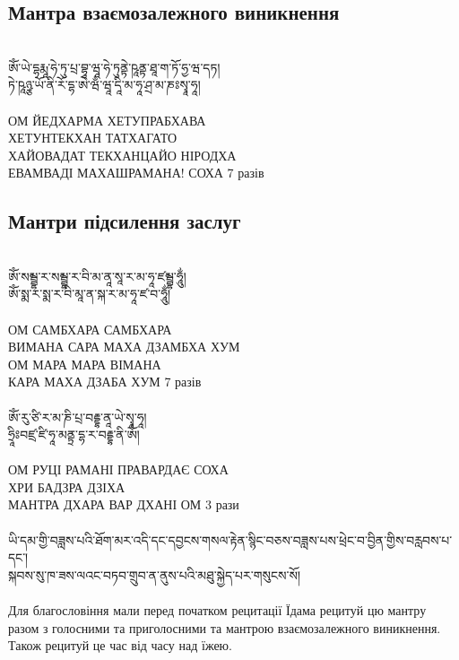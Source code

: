 \subsection*{Мантра взаємозалежного виникнення}
\\
\ti
ཨོཾ་ཡེ་དྷརྨཱ་ཧེ་ཏུ་པྲ་བྷཱ་ཝཱ་ཧེ་ཏུནྟེ་ཥཱནྟ་ཐཱ་ག་ཏོ་ཧྱ་ཝ་དཏ།\\
 ཏེ་ཥཱཉྩ་ཡོ་ནི་རོ་དྷ་ཨེ་ཝྃ་ཝཱ་དཱི་མ་ཧཱ་ཤྲ་མ་ཎཿསྭཱ་ཧཱ།\\
 \\
\ru
ОМ ЙЕДХАРМА ХЕТУПРАБХАВА\\
ХЕТУНТЕКХАН ТАТХАГАТО\\
ХАЙОВАДАТ ТЕКХАНЦАЙО НІРОДХА\\
ЕВАМВАДІ МАХАШРАМАНА! СОХА \hspace{1cm} 7 разів\\

\subsection*{Мантри підсилення заслуг}
\\
\ti
ཨོཾ་སམྦྷ་ར་སམྦྷ་ར་བི་མ་ནཱ་སཱ་ར་མ་ཧཱ་ཛམྦྷ་ཧཱུྂ།\\
ཨོཾ་སྨ་ར་སྨ་ར་བི་མཱ་ན་སྐ་ར་མ་ཧཱ་ཛ་བ་ཧཱུྂ།\\
\\
\ru
ОМ САМБХАРА САМБХАРА\\
ВИМАНА САРА МАХА ДЗАМБХА ХУМ\\
ОМ МАРА МАРА ВІМАНА\\
КАРА МАХА ДЗАБА ХУМ \hspace{1cm} 7 разів\\
\\
\ti
ཨོཾ་རུ་ཙི་ར་མ་ཎི་པྲ་བརྡྷ་ནཱ་ཡེ་སྭཱ་ཧཱ།\\
ཧྲཱིཿབཛྲ་ཛི་ཧཱ་མནྟྲ་དྷ་ར་བརྡྷ་ནི་ཨོཾ།\\
\\
\ru
ОМ РУЦІ РАМАНІ ПРАВАРДАЄ СОХА\\
ХРИ БАДЗРА ДЗІХА\\
МАНТРА ДХАРА ВАР ДХАНІ ОМ \hspace{1cm} 3 рази\\
\\
\scriptsize
\ti ཡི་དམ་གྱི་བཟླས་པའི་ཐོག་མར་འདི་དང་དབྱངས་གསལ་རྟེན་སྙིང་བཅས་བཟླས་པས་ཕྲེང་བ་བྱིན་གྱིས་བརླབས་པ་དང་།\\
སྐབས་སུ་ཁ་ཟས་ལའང་བཏབ་གྲུབ་ན་ནུས་པའི་མཐུ་སྐྱེད་པར་གསུངས་སོ།\\
\\
\ru Для благословіння мали перед початком рецитації Їдама
рецитуй цю мантру разом з голосними та приголосними
та мантрою взаємозалежного виникнення.
Також рецитуй це час від часу над їжею.
\normalsize
